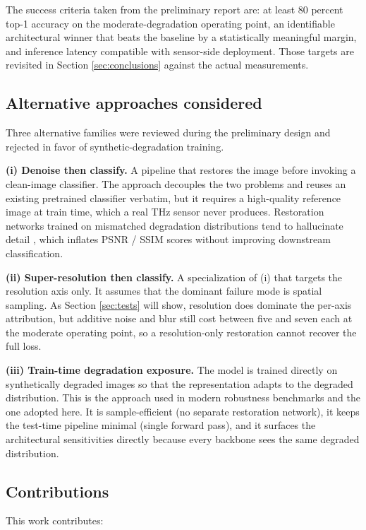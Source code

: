 The success criteria taken from the preliminary report are: at least 80
percent top-1 accuracy on the moderate-degradation operating point, an
identifiable architectural winner that beats the baseline by a statistically
meaningful margin, and inference latency compatible with sensor-side
deployment. Those targets are revisited in Section \ref{sec:conclusions}
against the actual measurements.

\subsection{Alternative approaches considered}
Three alternative families were reviewed during the preliminary design and
rejected in favor of synthetic-degradation training.

\textbf{(i) Denoise then classify.}\quad
A pipeline that restores the image before invoking a clean-image classifier.
The approach decouples the two problems and reuses an existing pretrained
classifier verbatim, but it requires a high-quality reference image at train
time, which a real THz sensor never produces. Restoration networks trained on
mismatched degradation distributions tend to hallucinate detail
\cite{huynh2008psnr, wang2004ssim}, which inflates PSNR / SSIM scores without
improving downstream classification.

\textbf{(ii) Super-resolution then classify.}\quad
A specialization of (i) that targets the resolution axis only. It assumes
that the dominant failure mode is spatial sampling. As Section
\ref{sec:tests} will show, resolution does dominate the per-axis attribution,
but additive noise and blur still cost between five and seven \Mpp{} each at
the moderate operating point, so a resolution-only restoration cannot recover
the full loss.

\textbf{(iii) Train-time degradation exposure.}\quad
The model is trained directly on synthetically degraded images so that the
representation adapts to the degraded distribution. This is the approach used
in modern robustness benchmarks \cite{hendrycks2021naturaladv} and the one
adopted here. It is sample-efficient (no separate restoration network), it
keeps the test-time pipeline minimal (single forward pass), and it surfaces
the architectural sensitivities directly because every backbone sees the
same degraded distribution.

\subsection{Contributions}
This work contributes:

